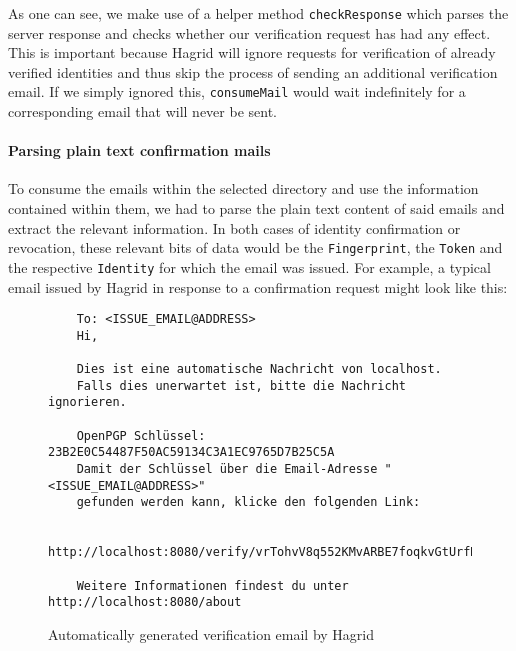 As one can see, we make use of a helper method \texttt{checkResponse} which parses the server response and checks whether our verification request has had any effect. This is important because Hagrid will ignore requests for verification of already verified identities and thus skip the process of sending an additional verification email. If we simply ignored this, \texttt{consumeMail} would wait indefinitely for a corresponding email that will never be sent. 

\paragraph{Parsing plain text confirmation mails}
To consume the emails within the selected directory and use the information contained within them, we had to parse the plain text content of said emails and extract the relevant information. In both cases of identity confirmation or revocation, these relevant bits of data would be the \texttt{Fingerprint}, the \texttt{Token} and the respective \texttt{Identity} for which the email was issued. For example, a typical email issued by Hagrid in response to a confirmation request might look like this: 
\begin{figure}[H]
    \begin{verbatim}
    To: <ISSUE_EMAIL@ADDRESS> 
    Hi,
    
    Dies ist eine automatische Nachricht von localhost.
    Falls dies unerwartet ist, bitte die Nachricht ignorieren.

    OpenPGP Schlüssel: 23B2E0C54487F50AC59134C3A1EC9765D7B25C5A 
    Damit der Schlüssel über die Email-Adresse "<ISSUE_EMAIL@ADDRESS>" 
    gefunden werden kann, klicke den folgenden Link:
    
    http://localhost:8080/verify/vrTohvV8q552KMvARBE7foqkvGtUrfDl3iiyX9yqeOX 
    
    Weitere Informationen findest du unter http://localhost:8080/about
    \end{verbatim}
    \caption{Automatically generated verification email by Hagrid}
\end{figure}

